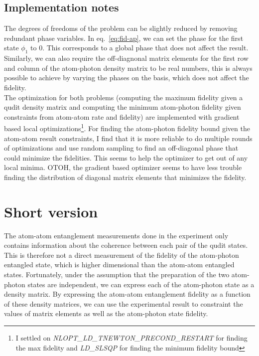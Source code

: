 \documentclass[10pt,fleqn]{article}
\begin{document}
\subsection{Implementation notes}
The degrees of freedoms of the problem can be slightly reduced by removing redundant phase variables.
In eq.~\ref{eq:fid-ap}, we can set the phase for the first state $\phi_1$ to $0$.
This corresponds to a global phase that does not affect the result.
Similarly, we can also require the off-diagnonal matrix elements for the first row and column of the atom-photon density matrix to be real numbers, this is always possible to achieve by varying the phases on the basis, which does not affect the fidelity.\\

The optimization for both problems (computing the maximum fidelity given a qudit density matrix and computing the minimum atom-photon fidelity given constraints from atom-atom rate and fidelity) are implemented with gradient based local optimizations\footnote{I settled on \textit{NLOPT\_LD\_TNEWTON\_PRECOND\_RESTART} for finding the max fidelity and \textit{LD\_SLSQP} for finding the minimum fidelity bound}. For finding the atom-photon fidelity bound given the atom-atom result constraints, I find that it is more reliable to do multiple rounds of optimizations and use random sampling to find an off-diagonal phase that could minimize the fidelities. This seems to help the optimizer to get out of any local minima. OTOH, the gradient based optimizer seems to have less trouble finding the distribution of diagonal matrix elements that minimizes the fidelity.

\section{Short version}

The atom-atom entanglement measurements done in the experiment only contains
information about the coherence between each pair of the qudit states.
This is therefore not a direct measurement of the fidelity of the atom-photon
entangled state, which is higher dimensional than the atom-atom entangled states.
Fortunately, under the assumption that the preparation of the two atom-photon states
are independent, we can express each of the atom-photon state as a density matrix.
By expressing the atom-atom entanglement fidelity as a function of
these density matrices, we can use the experimental result to constraint
the values of matrix elements as well as the atom-photon state fidelity.
\end{document}
